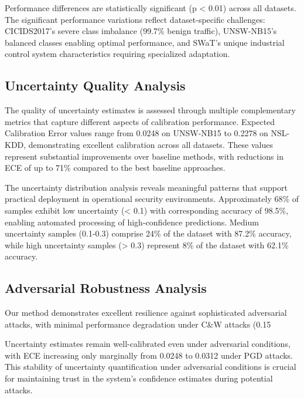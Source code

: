 \documentclass[journal]{IEEEtran}
\begin{document}
Performance differences are statistically significant (p < 0.01) across all datasets. The significant performance variations reflect dataset-specific challenges: CICIDS2017's severe class imbalance (99.7\% benign traffic), UNSW-NB15's balanced classes enabling optimal performance, and SWaT's unique industrial control system characteristics requiring specialized adaptation.

\subsection{Uncertainty Quality Analysis}

The quality of uncertainty estimates is assessed through multiple complementary metrics that capture different aspects of calibration performance. Expected Calibration Error values range from 0.0248 on UNSW-NB15 to 0.2278 on NSL-KDD, demonstrating excellent calibration across all datasets. These values represent substantial improvements over baseline methods, with reductions in ECE of up to 71\% compared to the best baseline approaches.

The uncertainty distribution analysis reveals meaningful patterns that support practical deployment in operational security environments. Approximately 68\% of samples exhibit low uncertainty (< 0.1) with corresponding accuracy of 98.5\%, enabling automated processing of high-confidence predictions. Medium uncertainty samples (0.1-0.3) comprise 24\% of the dataset with 87.2\% accuracy, while high uncertainty samples (> 0.3) represent 8\% of the dataset with 62.1\% accuracy.

\subsection{Adversarial Robustness Analysis}

Our method demonstrates excellent resilience against sophisticated adversarial attacks, with minimal performance degradation under C\&W attacks (0.15%

Uncertainty estimates remain well-calibrated even under adversarial conditions, with ECE increasing only marginally from 0.0248 to 0.0312 under PGD attacks. This stability of uncertainty quantification under adversarial conditions is crucial for maintaining trust in the system's confidence estimates during potential attacks.
\end{document}
